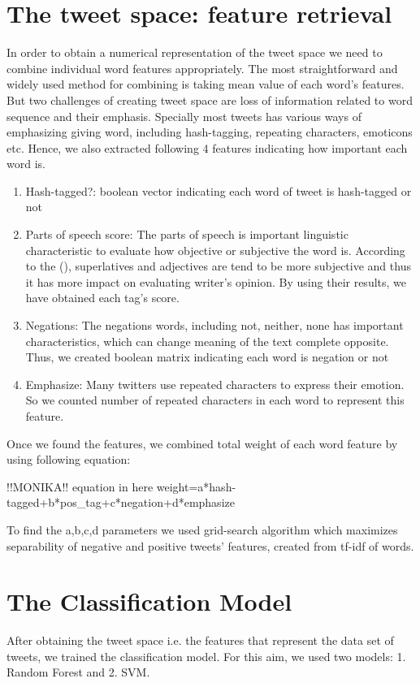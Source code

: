 \documentclass[10pt,conference,compsocconf]{IEEEtran}
\begin{document}
\section{The tweet space: feature retrieval}
In order to obtain a numerical representation of the tweet space we need to combine individual word features appropriately. The most straightforward and widely used method for combining is taking mean value of each word's features. But two challenges of creating tweet space are loss of information related to word sequence and their emphasis. Specially most tweets has various ways of emphasizing giving word, including hash-tagging, repeating characters, emoticons etc. Hence, we also extracted following 4 features indicating how important each word is.
\begin{enumerate}
\item Hash-tagged?: boolean vector indicating each word of tweet is hash-tagged or not
\item Parts of speech score: The parts of speech is important linguistic characteristic to evaluate how objective or subjective the word is. According to the (\cite{corpus}), superlatives and adjectives are tend to be more subjective and thus it has more impact on evaluating writer's opinion. By using their results, we have obtained each tag's score.
\item Negations: The negations words, including not, neither, none has important characteristics, which can change meaning of the text complete opposite. Thus, we created boolean matrix indicating each word is negation or not
\item Emphasize: Many twitters use repeated characters to express their emotion. So we counted number of repeated characters in each word to represent this feature.
\end{enumerate}
Once we found the features, we combined total weight of each word feature by using following equation:

!!MONIKA!! equation in here 
weight=a*hash-tagged+b*pos_tag+c*negation+d*emphasize 

To find the a,b,c,d parameters we used grid-search algorithm which maximizes separability of negative and positive tweets' features, created from tf-idf of words.

\section{The Classification Model}
After obtaining the tweet space i.e. the features that represent the data set of tweets, we trained the classification model. For this aim, we used two models: 1. Random Forest and 2. SVM. 
\end{document}
